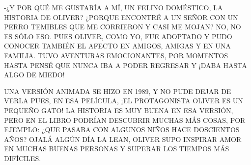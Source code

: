 \newpage
{}
\newpage
{}
-¿Y POR QUÉ ME GUSTARÍA A MÍ, UN FELINO DOMÉSTICO, LA HISTORIA DE OLIVER? ¿PORQUE ENCONTRÉ A UN SEÑOR CON UN PERRO TEMIBLES QUE ME CORRIERON Y CASI ME MOJAN? 
NO, NO ES SÓLO ESO. PUES OLIVER, COMO YO, FUE ADOPTADO Y PUDO CONOCER TAMBIÉN EL AFECTO EN AMIGOS, AMIGAS Y EN UNA FAMILIA. TUVO AVENTURAS EMOCIONANTES, POR MOMENTOS HASTA PENSÉ QUE NUNCA IBA A PODER REGRESAR Y ¡DABA HASTA ALGO DE MIEDO! 

UNA VERSIÓN ANIMADA SE HIZO EN 1989, Y NO PUDE DEJAR DE VERLA PUES, EN ESA PELÍCULA, ¡EL PROTAGONISTA OLIVER ES UN PEQUEÑO GATO!
LA HISTORIA ES MUY BUENA EN ESA VERSIÓN, PERO EN EL LIBRO PODRÍAN DESCUBRIR MUCHAS MÁS COSAS, POR EJEMPLO: ¿QUE PASABA CON ALGUNOS NIÑOS HACE DOSCIENTOS AÑOS?
OJALÁ ALGÚN DÍA LA LEAN, OLIVER SUPO INSPIRAR AMOR EN MUCHAS BUENAS PERSONAS Y SUPERAR LOS TIEMPOS MÁS DIFÍCILES.



